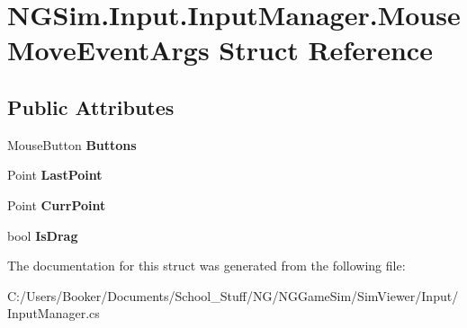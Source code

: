 \hypertarget{struct_n_g_sim_1_1_input_1_1_input_manager_1_1_mouse_move_event_args}{}\section{N\+G\+Sim.\+Input.\+Input\+Manager.\+Mouse\+Move\+Event\+Args Struct Reference}
\label{struct_n_g_sim_1_1_input_1_1_input_manager_1_1_mouse_move_event_args}
\subsection*{Public Attributes}
\begin{DoxyCompactItemize}
\item 
\mbox{\label{struct_n_g_sim_1_1_input_1_1_input_manager_1_1_mouse_move_event_args_a629d736d56820456cb0c12979f877ba6}} 
Mouse\+Button {\bfseries Buttons}
\item 
\mbox{\label{struct_n_g_sim_1_1_input_1_1_input_manager_1_1_mouse_move_event_args_a53130d94aa89b5f66f51843cd2e30b02}} 
Point {\bfseries Last\+Point}
\item 
\mbox{\label{struct_n_g_sim_1_1_input_1_1_input_manager_1_1_mouse_move_event_args_a6dc658eade8645f2a285db6df0c8cfb7}} 
Point {\bfseries Curr\+Point}
\item 
\mbox{\label{struct_n_g_sim_1_1_input_1_1_input_manager_1_1_mouse_move_event_args_af64051e54c9ed9d5deb320f5975a899a}} 
bool {\bfseries Is\+Drag}
\end{DoxyCompactItemize}


The documentation for this struct was generated from the following file\+:\begin{DoxyCompactItemize}
\item 
C\+:/\+Users/\+Booker/\+Documents/\+School\+\_\+\+Stuff/\+N\+G/\+N\+G\+Game\+Sim/\+Sim\+Viewer/\+Input/Input\+Manager.\+cs\end{DoxyCompactItemize}
